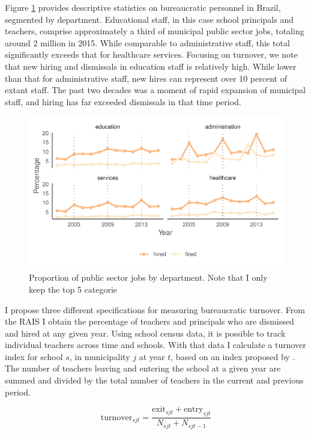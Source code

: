 \documentclass[12pt,a4paper]{article}
\begin{document}
Figure \ref{fig:staff_turnover} provides descriptive statistics on bureaucratic personnel in Brazil, segmented by department. Educational staff, in this case school principals and teachers, comprise approximately a third of municipal public sector jobs, totaling around 2 million in 2015. While comparable to administrative staff, this total significantly exceeds that for healthcare services. Focusing on turnover, we note that new hiring and dismissals in education staff is relatively high. While lower than that for administrative staff, new hires can represent over 10 percent of extant staff. The past two decades was a moment of rapid expansion of municipal staff, and hiring has far exceeded dismissals in that time period.

\begin{figure}[h]
    \centering
    \includegraphics{plots/descriptive_staff_turnover.pdf}
    \caption{Proportion of public sector jobs by department. Note that I only keep the top 5 categorie}
    \label{fig:staff_turnover}
\end{figure}

I propose three different specifications for measuring bureaucratic turnover. From the RAIS I obtain the percentage of teachers and principals who are dismissed and hired at any given year. Using school census data, it is possible to track individual teachers across time and schools. With that data I calculate a turnover index for school $s$, in municipality $j$ at year $t$, based on an index proposed by \citet{pereira_junior_indicadores_2016}. The number of teachers leaving and entering the school at a given year are summed and divided by the total number of teachers in the current and previous period.

$$\text{turnover}_{sjt} = \frac{\text{exit}_{sjt} + \text{entry}_{sjt}}{N_{sjt} + N_{sjt-1}}$$
\end{document}
